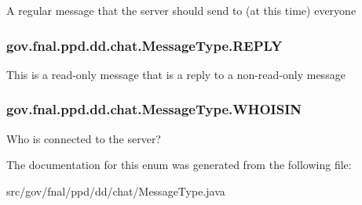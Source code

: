 A regular message that the server should send to (at this time) everyone \hypertarget{enumgov_1_1fnal_1_1ppd_1_1dd_1_1chat_1_1MessageType_a6ef4f1adf848fa896983c37f6f4c213d}{
\subsubsection[{R\-E\-P\-L\-Y}]{\setlength{\rightskip}{0pt plus 5cm}gov.\-fnal.\-ppd.\-dd.\-chat.\-Message\-Type.\-R\-E\-P\-L\-Y}}\label{enumgov_1_1fnal_1_1ppd_1_1dd_1_1chat_1_1MessageType_a6ef4f1adf848fa896983c37f6f4c213d}
This is a read-\/only message that is a reply to a non-\/read-\/only message \hypertarget{enumgov_1_1fnal_1_1ppd_1_1dd_1_1chat_1_1MessageType_aaed6083ff4a292a4ea95ef09c8cc0989}{
\subsubsection[{W\-H\-O\-I\-S\-I\-N}]{\setlength{\rightskip}{0pt plus 5cm}gov.\-fnal.\-ppd.\-dd.\-chat.\-Message\-Type.\-W\-H\-O\-I\-S\-I\-N}}\label{enumgov_1_1fnal_1_1ppd_1_1dd_1_1chat_1_1MessageType_aaed6083ff4a292a4ea95ef09c8cc0989}
Who is connected to the server? 

The documentation for this enum was generated from the following file\-:\begin{DoxyCompactItemize}
\item 
src/gov/fnal/ppd/dd/chat/Message\-Type.\-java\end{DoxyCompactItemize}
